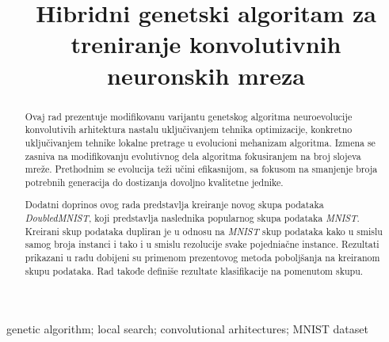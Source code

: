 \documentclass[lat]{simposium}
\begin{document}
\begin{frontmatter}

\title{Hibridni genetski algoritam za treniranje konvolutivnih neuronskih mreza}

\author{\textbf{ }}
\address{Matematički fakultet, Univerzitet u Beogradu, Studentski trg 16, 11000 Beograd\\
}
\author{\textbf{ }}
\address{Majkrosoft razvojni centar Srbija, Španskih boraca 3, 11070 Beograd\\
}
\author{\textbf{ }}
\address{Matematički fakultet, Univerzitet u Beogradu, Studentski trg 16, 11000 Beograd\\
}


\maketitle

\begin{abstract}

Ovaj rad prezentuje modifikovanu varijantu genetskog algoritma neuroevolucije konvolutivih arhitektura 
nastalu uključivanjem tehnika optimizacije, konkretno uključivanjem tehnike lokalne pretrage u evolucioni mehanizam 
algoritma. Izmena se zasniva na modifikovanju evolutivnog dela algoritma fokusiranjem na broj slojeva mreže. 
Prethodnim se evolucija teži učini efikasnijom, sa fokusom na smanjenje broja potrebnih generacija do dostizanja dovoljno kvalitetne jednike. 

Dodatni doprinos ovog rada predstavlja kreiranje novog skupa podataka \textit{DoubledMNIST}, koji predstavlja naslednika popularnog 
skupa podataka \textit{MNIST}. Kreirani skup podataka dupliran je u odnosu na \textit{MNIST} skup podataka kako u smislu samog broja instanci i tako i u smislu rezolucije 
svake pojedniačne instance. Rezultati prikazani u radu dobijeni su primenom prezentovog metoda poboljšanja na kreiranom 
skupu podataka. Rad takođe definiše rezultate klasifikacije na pomenutom skupu. 

\end{abstract}
\begin{keyword}
genetic algorithm; local search; convolutional arhitectures; MNIST dataset
\end{keyword}
\end{frontmatter}
\end{document}
